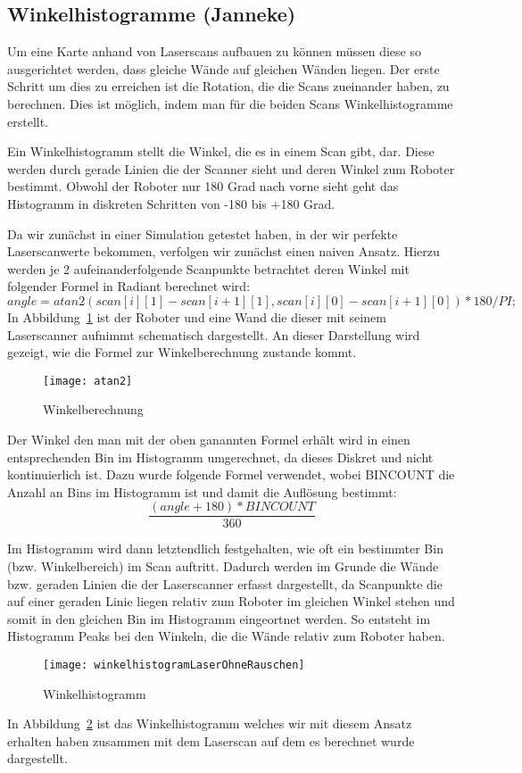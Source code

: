 \subsection{Winkelhistogramme (Janneke)}
\label{sec:winkelhistogramme}

Um eine Karte anhand von Laserscans aufbauen zu können müssen diese so ausgerichtet werden, dass gleiche Wände auf gleichen Wänden liegen. Der erste Schritt um dies zu erreichen ist die Rotation, die die Scans zueinander haben, zu berechnen. Dies ist möglich, indem man für die beiden Scans Winkelhistogramme erstellt.

Ein Winkelhistogramm stellt die Winkel, die es in einem Scan gibt, dar. Diese werden durch gerade Linien die der Scanner sieht und deren Winkel zum Roboter bestimmt. Obwohl der Roboter nur 180 Grad nach vorne sieht geht das Histogramm in diskreten Schritten von -180 bis +180 Grad.

Da wir zunächst in einer Simulation getestet haben, in der wir perfekte Laserscanwerte bekommen, verfolgen wir zunächst einen naiven Ansatz. Hierzu werden je 2 aufeinanderfolgende Scanpunkte betrachtet deren Winkel mit folgender Formel in Radiant berechnet wird: $$angle = atan2(scan[i][1] - scan[i+1][1], scan[i][0] - scan[i+1][0]) * 180 /PI;$$ In Abbildung~\ref{fig:Winkelberechnung} ist der Roboter und eine Wand die dieser mit seinem Laserscanner aufnimmt schematisch dargestellt. An dieser Darstellung wird gezeigt, wie die Formel zur Winkelberechnung zustande kommt.

\begin{figure}
	\centering
	\texttt{[image: atan2]}
	\caption{Winkelberechnung}
	\label{fig:Winkelberechnung}
\end{figure}

Der Winkel den man mit der oben ganannten Formel erhält wird in einen entsprechenden Bin im Histogramm umgerechnet, da dieses Diskret und nicht kontinuierlich ist. Dazu wurde folgende Formel verwendet, wobei BINCOUNT die Anzahl an Bins im Histogramm ist und damit die Auflösung bestimmt: $$\frac{(angle + 180) * BINCOUNT}{360}$$

Im Histogramm wird dann letztendlich festgehalten, wie oft ein bestimmter Bin (bzw. Winkelbereich) im Scan auftritt. Dadurch werden im Grunde die Wände bzw. geraden Linien die der Laserscanner erfasst dargestellt, da Scanpunkte die auf einer geraden Linie liegen relativ zum Roboter im gleichen Winkel stehen und somit in den gleichen Bin im Histogramm eingeortnet werden. So entsteht im Histogramm Peaks bei den Winkeln, die die Wände relativ zum Roboter haben.

\begin{figure}
	\centering
	\texttt{[image: winkelhistogramLaserOhneRauschen]}
	\caption{Winkelhistogramm}
	\label{fig:Winkelhistogramm}
\end{figure}

In Abbildung~\ref{fig:Winkelhistogramm} ist das Winkelhistogramm welches wir mit diesem Ansatz erhalten haben zusammen mit dem Laserscan auf dem es berechnet wurde dargestellt.